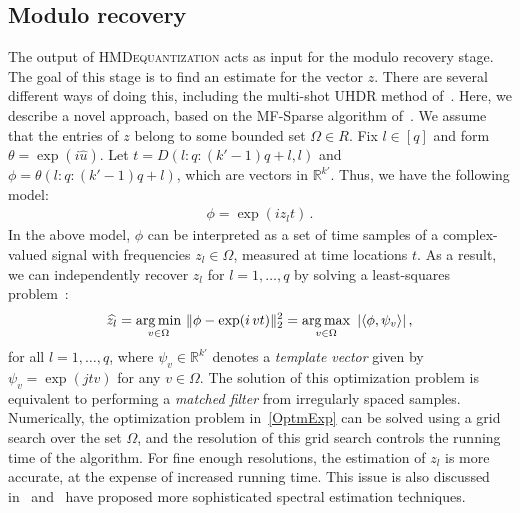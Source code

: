 \subsection{Modulo recovery}\label{ToneEst}
	\vspace{-0.5em}%
The output of \textsc{HMDequantization} acts as input for the modulo recovery stage. The goal of this stage is to find an estimate for the vector $z$. There are several different ways of doing this, including the multi-shot UHDR method of~\cite{ICCP15_Zhao}. Here, we describe a novel approach, based on the MF-Sparse algorithm of~\cite{SoltaniHegde_ICASSP16}. We assume that the entries of $z$ belong to some bounded set $\Omega \in R$. Fix $l \in [q]$ and form $\theta =  \exp(i \widehat{u})$. Let {$t = D(l:q:(k'-1)q+l,l)$ and $\phi = \theta(l:q:(k'-1)q+l)$}, 
which are vectors in $\mathbb{R}^{k'}$. Thus, we have the following model:
\begin{align}\label{tonmodel}
\phi = \exp(i z_l t) \, .
\end{align}
In the above model, $\phi$ can be interpreted as a set of time samples of a complex-valued signal with frequencies $z_l \in \Omega$, measured at time locations $t$. As a result, we can independently recover $z_l$ for $l=1, \ldots, q$ by solving a least-squares problem~\cite{eftekhari2013matched}:
\begin{align}
\label{OptmExp}
\widehat{z_l} = \underset{v \in \Omega}{\operatorname*{arg\,min}}~\|\phi - \exp(i \, vt )\|_2^2 = \underset{v \in \Omega}{\operatorname*{arg\,max}}~\left|\langle \phi,\psi_{v}\rangle\right|,
 \end{align}
for all $l=1,\ldots,q$, where  $\psi_{v}\in\mathbb{R}^{k'}$ denotes a \emph{template vector} given by $\psi_{v} = \exp(j t v)$ for any $v \in \Omega$. The solution of this optimization problem is equivalent to performing a \emph{matched filter} from irregularly spaced samples. Numerically, the optimization problem in~\eqref{OptmExp} can be solved using a grid search over the set $\Omega$, and the resolution of this grid search controls the running time of the algorithm. For fine enough resolutions, the estimation of $z_l$ is more accurate, at the expense of increased running time. This issue is also discussed in~\cite{eftekhari2013matched} and~\cite{eldarxampling,tangcsoffgrid,chioffgrid} have proposed more sophisticated spectral estimation techniques. %

